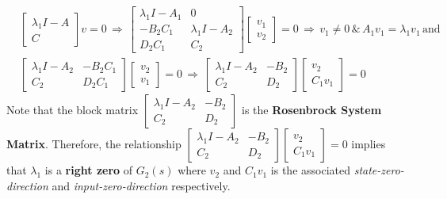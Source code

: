 \documentclass[twoside]{article}
\begin{document}
\begin{align*}
	&\left[ \begin{array}{c} \lambda_1 I - A \\ \hline C \end{array} \right] v = 0
	\, \Rightarrow \, 
	\left[ \begin{array}{c|c} \lambda_1 I - A_1 & 0 \\ \hline -B_2 C_1 &  \lambda_1 I - A_2 \\ \hline 
	D_2 C_1 & C_2
	\end{array} \right]  \begin{bmatrix} v_1 \\ v_2 \end{bmatrix} = 0
		\, \Rightarrow \, v_1 \neq 0 \, \& \, A_1 v_1 = \lambda_1 v_1 \, \mathrm{and}
		\\
	&\left[ \begin{array}{c|c} \lambda_1 I - A_2 & -B_2 C_1 \\ \hline 
	  C_2 & D_2 C_1
	\end{array} \right]  \begin{bmatrix} v_2 \\ v_1 \end{bmatrix} = 0	
	\, \Rightarrow \, 
	\left[ \begin{array}{c|c} \lambda_1 I - A_2 & -B_2  \\ \hline 
	  C_2 & D_2 
	\end{array} \right]  \begin{bmatrix} v_2 \\ C_1 v_1 \end{bmatrix} = 0	
\end{align*}
%
Note that the block matrix $\left[ \begin{array}{c|c} \lambda_1 I - A_2 & -B_2  \\ \hline C_2 & D_2 \end{array} \right]$ is the \textbf{Rosenbrock System Matrix}. Therefore, the relationship $\left[ \begin{array}{c|c} \lambda_1 I - A_2 & -B_2  \\ \hline 
	  C_2 & D_2 
	\end{array} \right]  \begin{bmatrix} v_2 \\ C_1 v_1 \end{bmatrix} = 0$
implies that $\lambda_1$ is a \textbf{right zero} of $G_2(s)$ where $v_2$ and $C_1 v_1$ 
is the associated \textit{state-zero-direction} and \textit{input-zero-direction}
respectively. 
\end{document}
